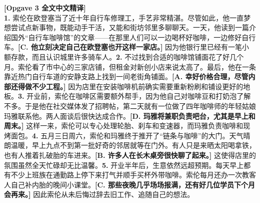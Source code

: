 \begin{transbox}
\small
\textbf{\color{NCDTeal}[Opgave 3 全文中文精译]}\\
\textbf{1.} 索伦在欧登塞当了近十年自行车修理工，手艺非常精湛。尽管如此，他一直梦想尝试点新事物，既能动手干活，又能和街坊邻里多聊聊天。一天，他读到一篇介绍国外“自行车咖啡馆”的文章——在那里人们可以一边喝杯好咖啡，一边修好自行车。\textbf{[C. 他立刻决定自己在欧登塞也开这样一家店。]} 因为他银行里已经有一笔小额存款，而且认识城里许多骑车人。\textbf{2.} 不过找到合适的咖啡馆铺面花了好几个月。索伦看了市中心的三家店铺，但租金对新创小店来说太高了。最后，他在一条靠近热门自行车道的安静支路上找到一间老街角铺面。\textbf{[A. 幸好价格合理，尽管内部还得做不少工程。]} 因为店里在安装咖啡机前确实需要重新粉刷和铺设更好的地板。\textbf{3.} 开业前，索伦在咖啡区需要额外帮手，因为他自己对咖啡豆和打奶泡了解不多。于是他在社交媒体发了招聘帖，第二天就有一位做了四年咖啡师的年轻姑娘玛雅联系他。两人面谈后很快达成合作。\textbf{[D. 玛雅将兼职负责吧台，尤其是早上和周末。]} 这样一来，索伦可以专心处理轮胎、刹车和变速器，而玛雅负责咖啡和现烤面包。\textbf{4.} 五月三日周六，索伦和玛雅终于推开了“链条与咖啡”的大门。天气晴朗温暖，早上九点不到第一批好奇的邻居就等在门外。有人只是来晒太阳喝拿铁，也有人推着扎破胎的车进来。\textbf{[B. 许多人在长木桌旁很快聊了起来。]} 这使得店里的氛围虽然全天忙碌却无比温馨。\textbf{5.} 开业半年后，生意依然远超预期。每天早上都有不少上班族在通勤路上停下来打气并顺手买杯外带咖啡。索伦每月还办一次教客人自己补内胎的晚间小课堂。\textbf{[C. 那些夜晚几乎场场报满，还有好几位学员下个月会再来。]} 因此索伦从未后悔过辞去旧工作、追随自己的想法。
\end{transbox}

